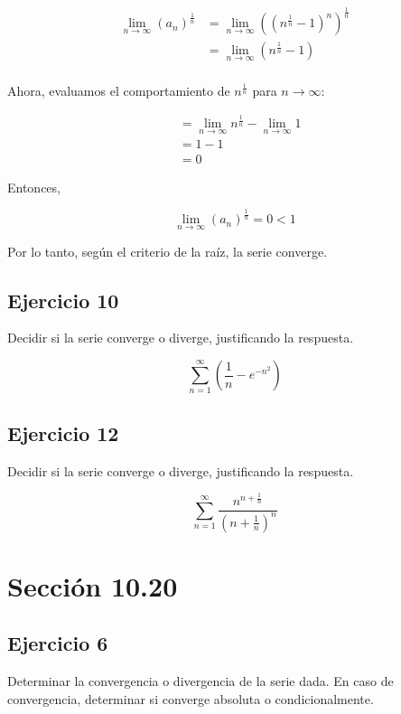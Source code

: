 \documentclass{article}
\begin{document}
    \[
    \begin{align*}
    \lim _{n \rightarrow \infty}\left(a_{n}\right)^{\frac{1}{n}} & = \lim _{n \rightarrow \infty}\left(\left(n^{\frac{1}{n}}-1\right)^{n}\right)^{\frac{1}{n}} \\
    & = \lim _{n \rightarrow \infty}\left(n^{\frac{1}{n}}-1\right) \\
    \end{align*}
    \]

    Ahora, evaluamos el comportamiento de \( n^{\frac{1}{n}} \) para \( n \to \infty \):

    \[
    \begin{align*}
    & = \lim _{n \rightarrow \infty} n^{\frac{1}{n}} - \lim _{n \rightarrow \infty} 1 \\
    & = 1 - 1 \\
    & = 0
    \end{align*}
    \]

    Entonces,

    \[
    \lim _{n \rightarrow \infty}\left(a_{n}\right)^{\frac{1}{n}} = 0 < 1
    \]

    Por lo tanto, según el criterio de la raíz, la serie converge.

    \subsection*{Ejercicio 10}

    Decidir si la serie converge o diverge, justificando la respuesta.

    $$
    \sum_{n=1}^{\infty}\left(\frac{1}{n}-e^{-n^{2}}\right)
    $$

    \subsection*{Ejercicio 12}

    Decidir si la serie converge o diverge, justificando la respuesta.

    $$
    \sum_{n=1}^{\infty} \frac{n^{n+\frac{1}{n}}}{\left(n+\frac{1}{n}\right)^{n}}
    $$
    \section*{Sección 10.20}
    \subsection*{Ejercicio 6}

    Determinar la convergencia o divergencia de la serie dada. En caso de convergencia, determinar si converge absoluta o condicionalmente.
\end{document}

